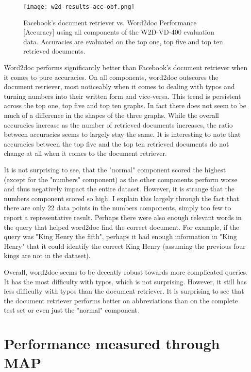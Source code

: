 \begin{figure}
  \begin{center}
    \texttt{[image: w2d-results-acc-obf.png]}
  \end{center}
  \captionsetup{width=.75\linewidth}
  \caption{Facebook's document retriever vs. Word2doc Performance [Accuracy] using all components of the W2D-VD-400 evaluation
  data. Accuracies are evaluated on the top one, top five and top ten retrieved documents.}
  \label{fig:w2d-results-acc-obf}
\end{figure}

Word2doc performs significantly better than Facebook's document retriever when it comes to pure accuracies. On all
components, word2doc outscores the document retriever, most noticeably when it comes to dealing with typos and turning numbers
into their written form and vice-versa. This trend is persistent across the top one, top five and top ten graphs. In fact there
does not seem to be much of a difference in the shapes of the three graphs. While the overall accuracies increase as the
number of retrieved documents increases, the ratio between accuracies seems to largely stay the same. It is interesting to note that
accuracies between the top five and the top ten retrieved documents do not change at all when it comes to the document retriever.

It is not surprising to see, that the "normal" component scored the highest (except for the "numbers" component) as the other
components perform worse and thus negatively impact the entire dataset. However, it is strange that the numbers component scored
so high. I explain this largely through the fact that there are only 22 data points in the numbers components, simply too few
to report a representative result. Perhaps there were also enough relevant words in the query that helped word2doc find the
correct document. For example, if the query was "King Henry the fifth", perhaps it had enough information in "King Henry" that it
could identify the correct King Henry (assuming the previous four kings are not in the dataset).

Overall, word2doc seems to be decently robust towards more complicated queries. It has the most difficulty with typos, which
is not surprising. However, it still has less difficulty with typos than the document retriever. It is surprising to see that
the document retriever performs better on abbreviations than on the complete test set or even just the "normal" component.

\section{Performance measured through MAP}
\label{results:map}

